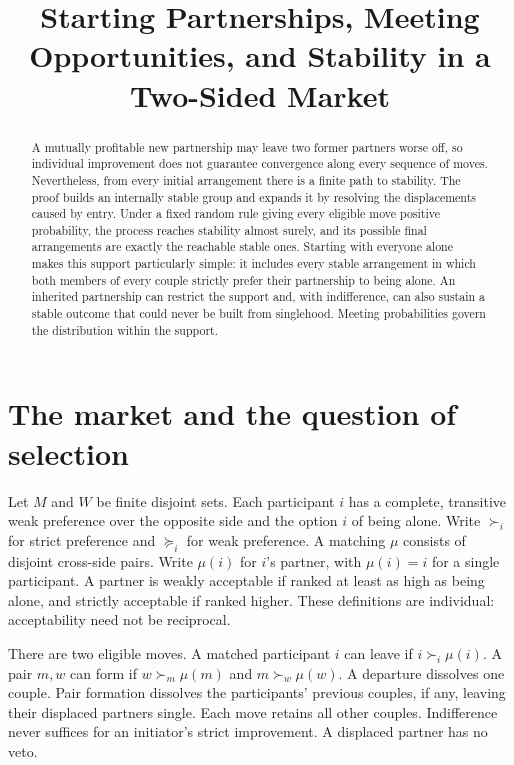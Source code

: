\documentclass[11pt]{article}
\title{Starting Partnerships, Meeting Opportunities, and Stability in a Two-Sided Market}
\author{}
\date{}
\begin{document}
\maketitle

\begin{abstract}
A mutually profitable new partnership may leave two former partners worse off, so individual improvement does not guarantee convergence along every sequence of moves. Nevertheless, from every initial arrangement there is a finite path to stability. The proof builds an internally stable group and expands it by resolving the displacements caused by entry. Under a fixed random rule giving every eligible move positive probability, the process reaches stability almost surely, and its possible final arrangements are exactly the reachable stable ones. Starting with everyone alone makes this support particularly simple: it includes every stable arrangement in which both members of every couple strictly prefer their partnership to being alone. An inherited partnership can restrict the support and, with indifference, can also sustain a stable outcome that could never be built from singlehood. Meeting probabilities govern the distribution within the support.
\end{abstract}

\section{The market and the question of selection}

Let \(M\) and \(W\) be finite disjoint sets. Each participant \(i\) has a complete, transitive weak preference over the opposite side and the option \(i\) of being alone. Write \(\succ_i\) for strict preference and \(\succeq_i\) for weak preference. A matching \(\mu\) consists of disjoint cross-side pairs. Write \(\mu(i)\) for \(i\)'s partner, with \(\mu(i)=i\) for a single participant. A partner is weakly acceptable if ranked at least as high as being alone, and strictly acceptable if ranked higher. These definitions are individual: acceptability need not be reciprocal.

There are two eligible moves. A matched participant \(i\) can leave if \(i\succ_i\mu(i)\). A pair \(m,w\) can form if \(w\succ_m\mu(m)\) and \(m\succ_w\mu(w)\). A departure dissolves one couple. Pair formation dissolves the participants' previous couples, if any, leaving their displaced partners single. Each move retains all other couples. Indifference never suffices for an initiator's strict improvement. A displaced partner has no veto.
\end{document}

